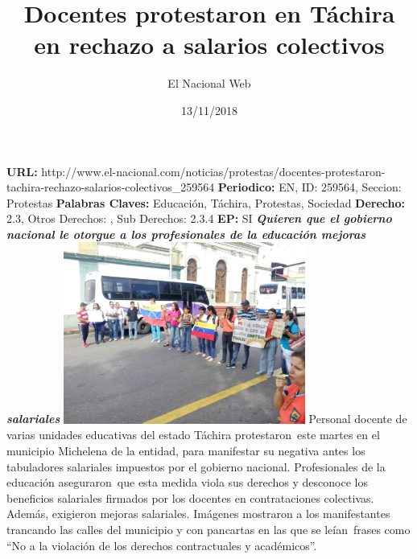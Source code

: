\documentclass{article}%
\title{\textbf{Docentes protestaron en Táchira en rechazo a salarios colectivos}}%
\author{El Nacional Web}%
\date{13/11/2018}%
\begin{document}
%
\normalsize%
\maketitle%
\textbf{URL: }%
http://www.el{-}nacional.com/noticias/protestas/docentes{-}protestaron{-}tachira{-}rechazo{-}salarios{-}colectivos\_259564\newline%
%
\textbf{Periodico: }%
EN, %
ID: %
259564, %
Seccion: %
Protestas\newline%
%
\textbf{Palabras Claves: }%
Educación, Táchira, Protestas, Sociedad\newline%
%
\textbf{Derecho: }%
2.3, %
Otros Derechos: %
, %
Sub Derechos: %
2.3.4\newline%
%
\textbf{EP: }%
SI\newline%
\newline%
%
\textbf{\textit{Quieren que el gobierno nacional le otorgue a los profesionales de la educación mejoras salariales}}%
\newline%
\newline%
%
\includegraphics[width=300px]{208.jpg}%
\newline%
%
Personal docente de varias unidades educativas del estado Táchira protestaron~este martes en el municipio Michelena de la entidad, para manifestar su negativa antes los tabuladores salariales impuestos por el gobierno nacional.%
\newline%
%
Profesionales de la educación aseguraron~que esta medida viola sus derechos y desconoce los beneficios salariales firmados por los docentes en contrataciones colectivas. Además, exigieron mejoras salariales.%
\newline%
%
Imágenes mostraron a los manifestantes trancando las calles del municipio y con pancartas en las que se leían~frases como “No a la violación de los derechos contractuales y académicos”.%
\newline%
%
\end{document}
